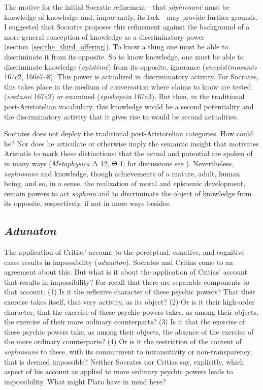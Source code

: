 The motive for the initial Socratic refinement—that \emph{sōphrosunē} must be knowledge of knowledge and, importantly, its lack—may provide further grounds. I suggested that Socrates proposes this refinement against the background of a more general conception of knowledge as a discriminatory power (section~\ref{sec:the_third_offering}). To know a thing one must be able to discriminate it from its opposite. So to know knowledge, one must be able to discriminate knowledge (\emph{epistēmē}) from its opposite, ignorance (\emph{anepistēmosunēs} 167c2, 166e7–8). This power is actualized in discriminatory activity. For Socrates, this takes place in the medium of conversation where claims to know are tested (\emph{exetasai} 167a2) or examined (\emph{episkopein} 167a3). But then, in the traditional post-Aristotelian vocabulary, this knowledge would be a second potentiality and the discriminatory activity that it gives rise to would be second actualities.

Socrates does not deploy the traditional post-Aristotelian categories. How could he? Nor does he articulate or otherwise imply the semantic insight that motivates Aristotle to mark these distinctions: that the actual and potential are spoken of in many ways (\emph{Metaphysica} {\sbl Δ} 12, {\sbl Θ} 1; for discussions see \citealt{Shields:2002jz}). Nevertheless, \emph{sōphrosunē} and knowledge, though achievements of a mature, adult, human being, and so, in a sense, the realization of moral and epistemic development, remain powers to act \emph{sophron} and to discriminate the object of knowledge from its opposite, respectively, if not in more ways besides. 


\subsection{\emph{Adunaton}} %
\label{sub:_emph_adunaton}

The application of Critias' account to the perceptual, conative, and cognitive cases results in impossibility (\emph{adunaton}). Socrates and Critias come to an agreement about this. But what is it about the application of Critias' account that results in impossibility? For recall that there are separable components to that account. (1) Is it the reflexive character of these psychic powers? That their exercise takes itself, that very activity, as its object? (2) Or is it their high-order character, that the exercise of these psychic powers takes, as among their objects, the exercise of their more ordinary counterparts? (3) Is it that the exercise of these psychic powers take, as among their objects, the absence of the exercise of the more ordinary counterparts? (4) Or is it the restriction of the content of \emph{sōphrosunē} to these, with its commitment to intransitivity or non-transparency, that is deemed impossible? Neither Socrates nor Critias say, explicitly, which aspect of his account as applied to more ordinary psychic powers leads to impossibility. What might Plato have in mind here?

